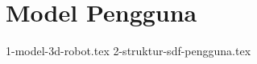 \section{Model Pengguna}
\label{sec:modelpengguna}

\textcolor{red}{\lipsum[1-2]}

{1-model-3d-robot.tex}
{2-struktur-sdf-pengguna.tex}

